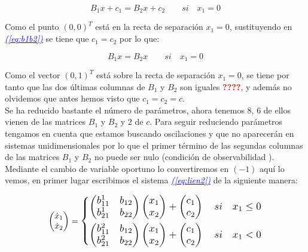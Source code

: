 \documentclass[12pt,a4paper]{report} %
\newcommand{\eref}[1]{\hyperref[#1]{\textcolor{blue}{\textit{(\ref*{#1})}}}}
\begin{document}
	\begin{equation}
		\label{eq:b1b2}
		B_1x+c_1=B_2x+c_2 \qquad si \quad x_1=0
	\end{equation}\smallskip
	
	Como el punto $(0,0)^T$ está en la recta de separación $x_1=0$, sustituyendo en \eref{eq:b1b2} se tiene que $c_1=c_2$ por lo que:
	
	\begin{equation}
		B_1x=B_2x \qquad si \quad x_1=0
	\end{equation}\smallskip
	
	Como el vector $(0,1)^T$ está sobre la recta de separación $x_1=0$, se tiene por tanto que las dos últimas columnas de $B_1$ y $B_2$ son iguales \textbf{\textcolor{red}{????}}, y además no olvidemos que  antes hemos visto que $c_1=c_2=c$.
	\\ [0.5cm]
	Se ha reducido bastante el número de parámetros, ahora tenemos 8, 6 de ellos vienen de las matrices $B_1$ y $B_2$ y 2 de $c$. Para seguir reduciendo parámetros tengamos en cuenta que estamos buscando oscilaciones y que no aparecerán en sistemas unidimensionales por lo que el primer término de las segundas columnas de las matrices $B_1$ y $B_2$ no puede ser nulo (condición de observabilidad \cite{onsimplyfing}). Mediante el cambio de variable oportuno lo convertiremos en $(-1)$ aquí lo vemos, en primer lugar escribimos el sistema \eref{eq:lien2} de la siguiente manera:
	
	\begin{equation}
		\begin{pmatrix*}[r]
			\dot{x}_1 \\ \dot{x}_2
		\end{pmatrix*}=
		\label{eq:lie-1}
		\scalebox{1.2}{$\displaystyle
			\left\{
			\begin{aligned}
				\begin{pmatrix*}[r]
					b_{11}^1 & b_{12} \\
					b_{21}^1 & b_{22}
				\end{pmatrix*}\begin{pmatrix*}[r]
				x_1\\x_2
				\end{pmatrix*}+\begin{pmatrix*}[r]
				c_1 \\ c_2
				\end{pmatrix*} \quad si \quad x_1 \leq 0 \\
				\begin{pmatrix*}[r]
					b_{11}^2 & b_{12} \\
					b_{21}^2 & b_{22}
				\end{pmatrix*}\begin{pmatrix*}[r]
				x_1\\x_2
				\end{pmatrix*}+\begin{pmatrix*}[r]
					c_1 \\ c_2
				\end{pmatrix*} \quad si \quad x_1 < 0
			\end{aligned}
			\right.
			$}
	\end{equation}\smallskip
	
\end{document}
